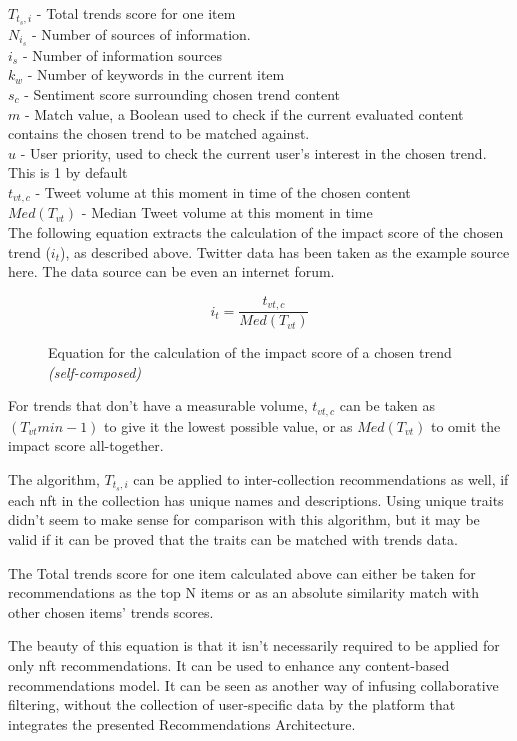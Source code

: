 \noindent$T_{t_{s},i}$ - Total trends score for one item\\
$N_{i_{s}}$ - Number of sources of information.\\
$i_{s}$ - Number of information sources\\
$k_{w}$ - Number of keywords in the current item\\
$s_{c}$ - Sentiment score surrounding chosen trend content\\
$m$ - Match value, a Boolean used to check if the current evaluated content contains the chosen trend to be matched against. \\
$u$ - User priority, used to check the current user's interest in the chosen trend. This is 1 by default\\
$t_{vt,c}$ - Tweet volume at this moment in time of the chosen content \\
$Med(T_{vt})$ - Median Tweet volume at this moment in time\\

\noindent The following equation extracts the calculation of the impact score of the chosen trend ($i_{t}$), as described above. Twitter data has been taken as the example source here. The data source can be even an internet forum.
\begin{figure}[h!]
\begin{equation}
i_{t} = \frac{t_{vt,c}}{Med(T_{vt})}
\end{equation}
\caption*{Equation for the calculation of the impact score of a chosen trend \textit{(self-composed)}}
\end{figure}

For trends that don't have a measurable volume, $t_{vt,c}$ can be taken as $\left(T_{vt}{min} - 1\right)$ to give it the lowest possible value, or as $Med(T_{vt})$ to omit the impact score all-together.

\bigbreak
The algorithm, $T_{t_{s},i}$ can be applied to inter-collection recommendations as well, if each \gls{nft} in the collection has unique names and descriptions. Using unique traits didn't seem to make sense for comparison with this algorithm, but it may be valid if it can be proved that the traits can be matched with trends data.

The Total trends score for one item calculated above can either be taken for recommendations as the top N items or as an absolute similarity match with other chosen items' trends scores.

\bigbreak
The beauty of this equation is that it isn't necessarily required to be applied for only \gls{nft} recommendations. It can be used to enhance any content-based recommendations model. It can be seen as another way of infusing collaborative filtering, without the collection of user-specific data by the platform that integrates the presented Recommendations Architecture.

